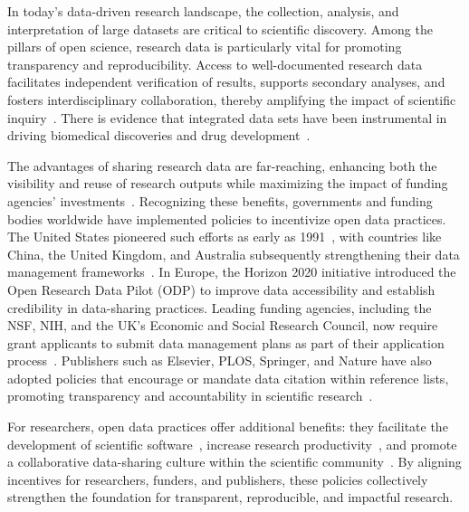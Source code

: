 In today’s data-driven research landscape, the collection, analysis, and interpretation of large datasets are critical to scientific discovery. Among the pillars of open science, research data is particularly vital for promoting transparency and reproducibility. Access to well-documented research data facilitates independent verification of results, supports secondary analyses, and fosters interdisciplinary collaboration, thereby amplifying the impact of scientific inquiry~\citep{hossain2016state,milham_assessment_2018}. There is evidence that integrated data sets have been instrumental in driving biomedical discoveries and drug development~\citep{shahin2020open}.

The advantages of sharing research data are far-reaching, enhancing both the visibility and reuse of research outputs while maximizing the impact of funding agencies' investments~\citep{los_riding_2010}. Recognizing these benefits, governments and funding bodies worldwide have implemented policies to incentivize open data practices. The United States pioneered such efforts as early as 1991~\citep{bromley_policy_1991}, with countries like China, the United Kingdom, and Australia subsequently strengthening their data management frameworks~\citep{china____policy,uk_policy,australia_policy}. In Europe, the Horizon 2020 initiative introduced the Open Research Data Pilot (ODP) to improve data accessibility and establish credibility in data-sharing practices. Leading funding agencies, including the NSF, NIH, and the UK’s Economic and Social Research Council, now require grant applicants to submit data management plans as part of their application process~\citep{smith2012institutional,spengler2012data}. Publishers such as Elsevier, PLOS, Springer, and Nature have also adopted policies that encourage or mandate data citation within reference lists, promoting transparency and accountability in scientific research~\citep{cousijn_data_2018,walton_data_2010,plos_policy,Springer_policy}.

For researchers, open data practices offer additional benefits: they facilitate the development of scientific software~\citep{niemeyer_challenge_2016}, increase research productivity~\citep{mcnaught_changing_2015}, and promote a collaborative data-sharing culture within the scientific community~\citep{belter_measuring_2014}. By aligning incentives for researchers, funders, and publishers, these policies collectively strengthen the foundation for transparent, reproducible, and impactful research.



